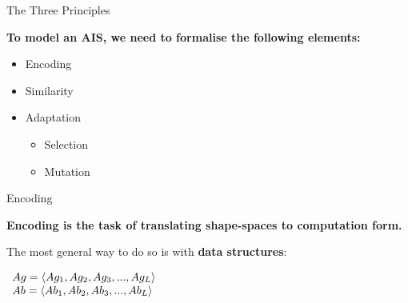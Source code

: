 \documentclass[xcolor=svgnames]{beamer}
\begin{document}
        \begin{frame}{The Three Principles}

            \textbf{To model an AIS, we need to formalise the following elements:}

            \begin{itemize}
                \item Encoding
                \item Similarity
                \item Adaptation
                \begin{itemize}
                    \item Selection
                    \item Mutation
                \end{itemize}
            \end{itemize}
        \end{frame}

		\begin{frame}{Encoding}
            
            \textbf{Encoding is the task of translating shape-spaces to computation form.}
            
            \vspace{1em}
            The most general way to do so is with \textbf{data structures}:
            
            \vspace{0.5em}
        	
			\begin{center}
				$\begin{array}{ll}
					Ag = \langle Ag_1,Ag_2,Ag_3,...,Ag_L \rangle \cr
					Ab = \langle Ab_1,Ab_2,Ab_3,...,Ab_L \rangle \cr
                 \end{array}$
            \end{center}            
		\end{frame}
        
\end{document}
